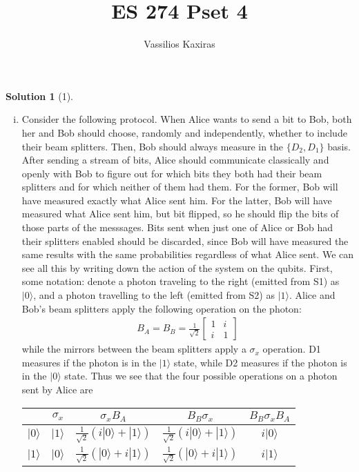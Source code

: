 \documentclass[11pt]{article}
\author{Vassilios Kaxiras}
\title{ES 274 Pset 4}
\theoremstyle{definition}
\newtheorem*{solution}{Solution}
\newcommand{\eq}{\begin{equation}\begin{aligned}}
\newcommand{\qe}{\end{aligned}\end{equation}}
\newcommand{\ket}[1]{|#1\rangle}
\newcommand{\mat}{\begin{bmatrix}}
\newcommand{\tam}{\end{bmatrix}}
\begin{document}
\maketitle

\begin{solution}[1]
  \begin{enumerate}[(i)]
    \item Consider the following protocol. When Alice wants to send a bit to Bob, both her and Bob should choose, randomly and independently, whether to include their beam splitters. Then, Bob should always measure in the $\{D_2,D_1\}$ basis. After sending a stream of bits, Alice should communicate classically and openly with Bob to figure out for which bits they both had their beam splitters and for which neither of them had them. For the former, Bob will have measured exactly what Alice sent him. For the latter, Bob will have measured what Alice sent him, but bit flipped, so he should flip the bits of those parts of the messsages. Bits sent when just one of Alice or Bob had their splitters enabled should be discarded, since Bob will have measured the same results with the same probabilities regardless of what Alice sent. We can see all this by writing down the action of the system on the qubits. First, some notation: denote a photon traveling to the right (emitted from S1) as $\ket{0}$, and a photon travelling to the left (emitted from S2) as $\ket{1}$. Alice and Bob's beam splitters apply the following operation on the photon:
    \eq
      B_A=B_B=\frac{1}{\sqrt{2}}\mat 1 & i \\ i & 1\tam
    \qe
    while the mirrors between the beam splitters apply a $\sigma_x$ operation. D1 measures if the photon is in the $\ket{1}$ state, while D2 measures if the photon is in the $\ket{0}$ state. Thus we see that the four possible operations on a photon sent by Alice are
    \begin{center}
      \begin{tabular}{c|c|c|c|c}
        & $\sigma_x$ & $\sigma_x B_A$ & $B_B\sigma_x$ & $B_B\sigma_x B_A$ \\
        \hline
        $\ket{0}$ & $\ket{1}$ & $\frac{1}{\sqrt{2}}(i\ket{0}+\ket{1})$ & $\frac{1}{\sqrt{2}}(i\ket{0}+\ket{1})$ & $i\ket{0}$ \\
        $\ket{1}$ & $\ket{0}$ & $\frac{1}{\sqrt{2}}(\ket{0}+i\ket{1})$ & $\frac{1}{\sqrt{2}}(\ket{0}+i\ket{1})$ & $i\ket{1}$ \\
      \end{tabular}
    \end{center}

\end{enumerate}
\end{solution}
\end{document}
